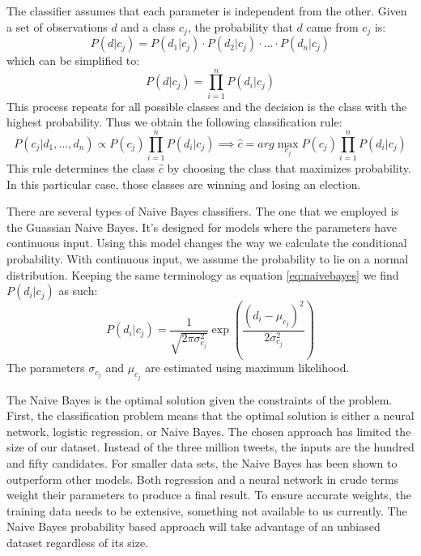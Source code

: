 \documentclass[11pt, twoside, reqno]{book}
\begin{document}
The classifier assumes that each parameter is independent from the other. Given a set of observations $d$ and a class $c_j$, the probability that $d$ came from $c_j$ is:
\begin{equation}
\label{eq:naivebayes}
P(d|c_j) = P(d_1|c_j) \cdot P(d_2|c_j) \cdot \ldots \cdot P(d_n|c_j)
\end{equation}
which can be simplified to:
\begin{equation}
\label{eq:simnaivebayes}
P(d|c_j) = \prod^{n}_{i=1} P(d_i|c_j)
\end{equation}
This process repeats for all possible classes and the decision is the class with the highest probability. Thus we obtain the following classification rule:
\begin{equation}
\label{eq:classrule}
P(c_j | d_1,\dots,d_n) \propto P(c_j) \prod^{n}_{i=1} P(d_i | c_j) \implies \hat{c} = arg\max_{c_j}P(c_j)\prod^{n}_{i=1}P(d_i | c_j)
\end{equation}
This rule determines the class $\hat{c}$ by choosing the class that maximizes probability. In this particular case, those classes are winning and losing an election. 

There are several types of Naive Bayes classifiers. The one that we employed is the Guassian Naive Bayes. It's designed for models where the parameters have continuous input. Using this model changes the way we calculate the conditional probability. With continuous input, we assume the probability to lie on a normal distribution. Keeping the same terminology as equation \ref{eq:naivebayes} we find $P(d_i | c_j)$ as such:
\begin{equation}
\label{eq:gaussprob}
P(d_i | c_j) = \dfrac{1}{\sqrt{2\pi\sigma^{2}_{c_j}}}\exp\left(\dfrac{(d_i - \mu_{c_j})^2}{2\sigma^{2}_{c_j}}\right)
\end{equation}
The parameters $\sigma_{c_j}$ and $\mu_{c_j}$ are estimated using maximum likelihood. 

The Naive Bayes is the optimal solution given the constraints of the problem. First, the classification problem means that the optimal solution is either a neural network, logistic regression, or Naive Bayes. The chosen approach has limited the size of our dataset. Instead of the three million tweets, the inputs are the hundred and fifty candidates. For smaller data sets, the Naive Bayes has been shown to outperform other models. Both regression and a neural network in crude terms weight their parameters to produce a final result. To ensure accurate weights, the training data needs to be extensive, something not available to us currently. The Naive Bayes probability based approach will take advantage of an unbiased dataset regardless of its size. 
\end{document}

